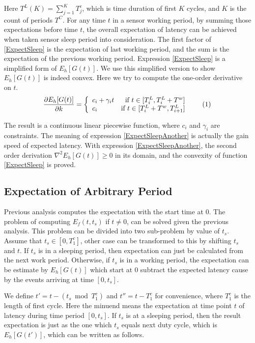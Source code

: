 \documentclass[conference]{IEEEtran}
\newcommand\numberthis{\addtocounter{equation}{1}\tag{\theequation}}
\begin{document}
Here $T^{L}(K) = \sum_{j=1}^{K} T^{c}_{j}$, which is time duration of first $K$ cycles, and $K$ is the count of periods $T^{C}$. 
For any time $t$ in a sensor working period, by summing those expectations before time $t$, the overall expectation of latency can be achieved when taken sensor sleep period into consideration. 
The first factor of \eqref{ExpectSleep} is the expectation of last working period, and the sum is the expectation of the previous working period. Expression \eqref{ExpectSleep} is a simplified form of $E_h[G(t)]$.
We use this simplified version to show $E_h[G(t)]$ is indeed convex.
Here we try to compute the one-order derivative on $t$.
\[\frac{\partial E_h[G(t)]}{\partial k} = \left\{
\begin{array}{lr}
c_i+\gamma_i t & \text{if }t \in [T^{L}_{i}, T^{L}_{i}+T^{w}]\\
c_i & \text{if }t \in [T^{L}_{i}+T^{w}, T^{L}_{i+1}]
\end{array}	\numberthis \label{ExpectSleepAnother}
\right.
\]

The result is a continuous linear piecewise function, where $c_i$ and $\gamma_i$ are constraints.
The meaning of expression \eqref{ExpectSleepAnother} is actually the gain speed of expected latency. 
With expression \eqref{ExpectSleepAnother}, the second order derivation $\nabla^{2} E_h[G(t)]\geq0$ in its domain, and the convexity of function \eqref{ExpectSleep} is proved. 

\subsection{Expectation of Arbitrary Period}
Previous analysis computes the expectation with the start time at $0$. 
The problem of computing $E_f(t,t_s)$ if $t\ne0$, can be solved given the previous analysis. 
This problem can be divided into two sub-problem by value of $t_s$.
Assume that $t_s\in [0,T^{c}_{1}]$, other case can be transformed to this by shifting $t_s$ and $t$.
If $t_s$ is in a sleeping period, then expectation can just be calculated from the next work period.
Otherwise, if $t_s$ is in a working period, the expectation can be estimate by $E_h[G(t)]$ which start at $0$ subtract the expected latency cause by the events arriving at time $[0, t_s]$.

We define $t'=t-(t_s\bmod T^{c}_{1})$ and $t''=t-T^{c}_{1}$ for convenience, where $T^{c}_{1}$ is the length of first cycle.
Here the minuend means the expectation at time point $t$ of latency during time period $[0, t_s]$.
If $t_s$ is at a sleeping period, then the result expectation is just as the one which $t_s$ equals next duty cycle, which is $E_h[G(t')]$, which can be written as follows.
\end{document}
